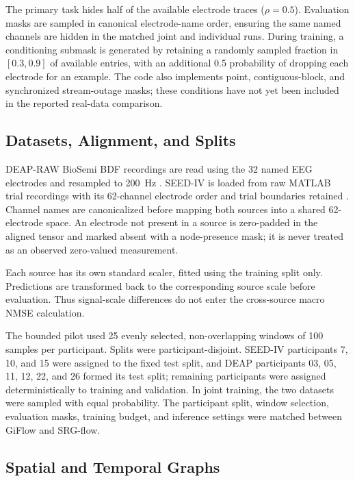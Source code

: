\documentclass{article}
\begin{document}
The primary task hides half of the available electrode traces
($\rho=0.5$). Evaluation masks are sampled in canonical electrode-name order,
ensuring the same named channels are hidden in the matched joint and
individual runs. During training, a conditioning submask is generated by
retaining a randomly sampled fraction in $[0.3,0.9]$ of available entries,
with an additional 0.5 probability of dropping each electrode for an
example. The code also implements point, contiguous-block, and synchronized
stream-outage masks; these conditions have not yet been included in the
reported real-data comparison.

\subsection{Datasets, Alignment, and Splits}

DEAP-RAW BioSemi BDF recordings are read using the 32 named EEG electrodes
and resampled to 200~Hz \cite{koelstra2012deap}. SEED-IV is loaded from raw
MATLAB trial recordings with its 62-channel electrode order and trial
boundaries retained \cite{zheng2019emotionmeter}. Channel names are
canonicalized before mapping both sources into a shared 62-electrode space.
An electrode not present in a source is zero-padded in the aligned tensor
and marked absent with a node-presence mask; it is never treated as an
observed zero-valued measurement.

Each source has its own standard scaler, fitted using the training split
only. Predictions are transformed back to the corresponding source scale
before evaluation. Thus signal-scale differences do not enter the
cross-source macro NMSE calculation.

The bounded pilot used 25 evenly selected, non-overlapping windows of
100 samples per participant. Splits were participant-disjoint. SEED-IV
participants 7, 10, and 15 were assigned to the fixed test split, and DEAP
participants 03, 05, 11, 12, 22, and 26 formed its test split; remaining
participants were assigned deterministically to training and validation.
In joint training, the two datasets were sampled with equal probability.
The participant split, window selection, evaluation masks, training budget,
and inference settings were matched between GiFlow and SRG-flow.

\subsection{Spatial and Temporal Graphs}
\end{document}

